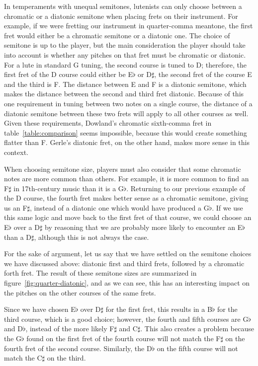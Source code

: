 In temperaments with unequal semitones, lutenists can only choose between a chromatic
or a diatonic semitone when placing frets on their instrument.  For example, if we
were fretting our instrument in quarter-comma meantone, the first fret would either be
a chromatic semitone or a diatonic one.  The choice of semitone is up to the player,
but the main consideration the player should take into account is whether any pitches on that
fret must be chromatic or diatonic.  For a lute in standard G tuning, the second
course is tuned to D; therefore, the first fret of the D course could either be
E$\flat$ or D$\sharp$, the second fret of the course E and the third is F.  The
distance between E and F is a diatonic semitone, which makes the distance between the
second and third fret diatonic.  Because of this one requirement in tuning
between two notes on a single course, the distance of a diatonic semitone between these
two frets will apply to all other courses as well.  Given these requirements, Dowland's
chromatic sixth-comma fret in table~\ref{table:comparison} seems impossible, because
this would create something flatter than F. Gerle's diatonic fret, on the other hand,
makes more sense in this context.

When choosing semitone size, players must also consider that some
chromatic notes are more common than others.  For example, it is more common to find an
F$\sharp$ in 17th-century music than it is a G$\flat$.  Returning to our previous example
of the D course, the fourth fret makes better sense as a chromatic semitone, giving us an
F$\sharp$, instead of a diatonic one which would have produced a G$\flat$.  If we use this
same logic and move back to the first fret of that course, we could choose an E$\flat$
over a D$\sharp$ by reasoning that we are probably more likely to encounter an
E$\flat$ than a D$\sharp$, although this is not always the case.

For the sake of argument, let us say that we have settled on the semitone choices we have
discussed above: diatonic first and third frets, followed by a chromatic forth fret.  The
result of these semitone sizes are summarized in figure~\ref{fig:quarter-diatonic}, and as
we can see, this has an interesting impact on the pitches on the other courses
of the same frets.

Since we have chosen E$\flat$ over D$\sharp$ for the first fret, this results in a
B$\flat$ for the third course, which is a good choice; however, the fourth and fifth
courses are G$\flat$ and D$\flat$, instead of the more likely F$\sharp$ and C$\sharp$.
This also creates a problem because the G$\flat$ found on the first fret of the fourth
course will not match the F$\sharp$ on the fourth fret of the second course. Similarly,
the D$\flat$ on the fifth course will not match the C$\sharp$ on the third.

